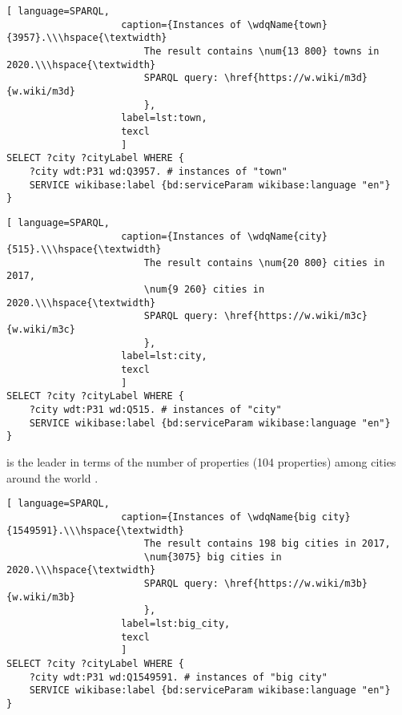 \begin{lstlisting}[ language=SPARQL, 
                    caption={Instances of \wdqName{town}{3957}.\\\hspace{\textwidth}
                        The result contains \num{13 800} towns in 2020.\\\hspace{\textwidth}
                        SPARQL query: \href{https://w.wiki/m3d}{w.wiki/m3d}
                        },
                    label=lst:town,
                    texcl 
                    ]
SELECT ?city ?cityLabel WHERE {
	?city wdt:P31 wd:Q3957. # instances of "town"
	SERVICE wikibase:label {bd:serviceParam wikibase:language "en"}
}
\end{lstlisting}%

\newpage

\begin{lstlisting}[ language=SPARQL, 
                    caption={Instances of \wdqName{city}{515}.\\\hspace{\textwidth}
                        The result contains \num{20 800} cities in 2017, 
                        \num{9 260} cities in 2020.\\\hspace{\textwidth}
                        SPARQL query: \href{https://w.wiki/m3c}{w.wiki/m3c}
                        },
                    label=lst:city,
                    texcl 
                    ]
SELECT ?city ?cityLabel WHERE {
	?city wdt:P31 wd:Q515. # instances of "city"
	SERVICE wikibase:label {bd:serviceParam wikibase:language "en"}
}
\end{lstlisting}%

 is the leader in terms of the number of properties (104 properties) among cities around the world . %

\begin{lstlisting}[ language=SPARQL, 
                    caption={Instances of \wdqName{big city}{1549591}.\\\hspace{\textwidth}
                        The result contains 198 big cities in 2017, 
                        \num{3075} big cities in 2020.\\\hspace{\textwidth}
                        SPARQL query: \href{https://w.wiki/m3b}{w.wiki/m3b}
                        },
                    label=lst:big_city,
                    texcl 
                    ]
SELECT ?city ?cityLabel WHERE {
	?city wdt:P31 wd:Q1549591. # instances of "big city"    
	SERVICE wikibase:label {bd:serviceParam wikibase:language "en"}
}
\end{lstlisting}%

